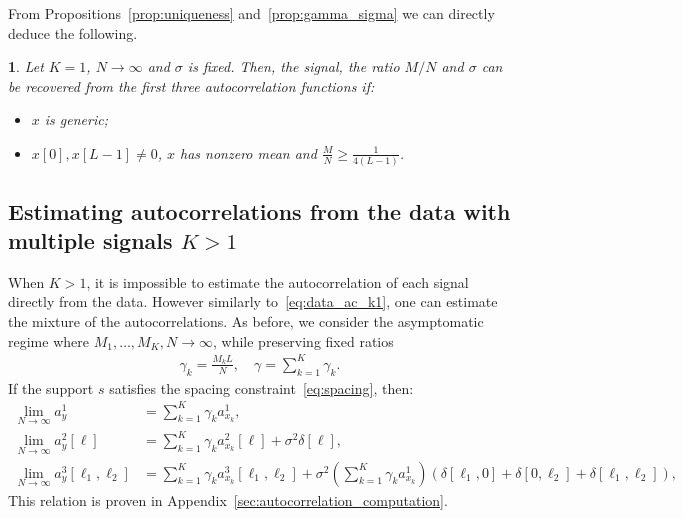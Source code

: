 \documentclass[english,11pt]{article}
\newcommand{\TODO}[1]{{\color{red}{[#1]}}}
\numberwithin{equation}{section}
\theoremstyle{plain}
\theoremstyle{definition}
\theoremstyle{remark}
\theoremstyle{plain}
\theoremstyle{remark}
\theoremstyle{plain}
\newtheorem{corollary}[thm]{\protect\corollaryname}
\theoremstyle{plain}
\providecommand{\corollaryname}{Corollary}
\begin{document}
From Propositions~\ref{prop:uniqueness} and~\ref{prop:gamma_sigma} we can directly deduce the following.
\begin{corollary}
	Let $K=1$, $N\to\infty$ and $\sigma$ is fixed. Then, the signal, the ratio $M/N$ and $\sigma$ can be recovered from the first three autocorrelation functions if:
	\begin{itemize}
		\item $x$ is generic;
		\item  $x[0],x[L-1]\neq 0$, $x$ has nonzero mean and $\frac{M}{N}\geq\frac{1}{4(L-1)}$.
	\end{itemize}
\end{corollary}
 
 
\subsection{Estimating autocorrelations from the data with multiple signals $K>1$} \label{sec:estimating_ac}

When $K>1$, it is impossible \TODO{That's not true: we can do our procedure, which gives estimate of the signals, and moments of that are estimates of the moments of the individual signals. Whether one calls this 'direct' or not is subjective. I'd remove that sentence.)} to estimate the autocorrelation of each signal directly from the data. However similarly to~\eqref{eq:data_ac_k1}, one can estimate the mixture of the autocorrelations. 
As before, we consider  the asymptomatic regime where $M_1,\ldots,M_K,N\to\infty$, while preserving fixed ratios
\begin{align}
	\gamma_k = \frac{M_k L}{N}, \quad \gamma = \sum_{k=1}^K\gamma_k.
\end{align}
If the support $s$ satisfies the spacing constraint~\eqref{eq:spacing}, then:
\begin{align}
\lim_{N\to\infty} a_y^1 & = \sum_{k=1}^K\gamma_k a_{x_k}^1, \nonumber\\
\lim_{N\to\infty} a_y^2[\ell] & = \sum_{k=1}^K\gamma_k a_{x_k}^2[\ell] +\sigma^2\delta[\ell],  \label{eq:data_ac}\\
\lim_{N\to\infty} a_y^3[\ell_1,\ell_2] & = \sum_{k=1}^K\gamma_k a_{x_k}^3[\ell_1,\ell_2] + \sigma^2\left(\sum_{k=1}^K\gamma_k a_{x_k}^1\right)(\delta[\ell_1,0]+\delta[0,\ell_2]+\delta[\ell_1,\ell_2]), \nonumber
\end{align}
This relation is proven in  Appendix~\ref{sec:autocorrelation_computation}.
\end{document}
